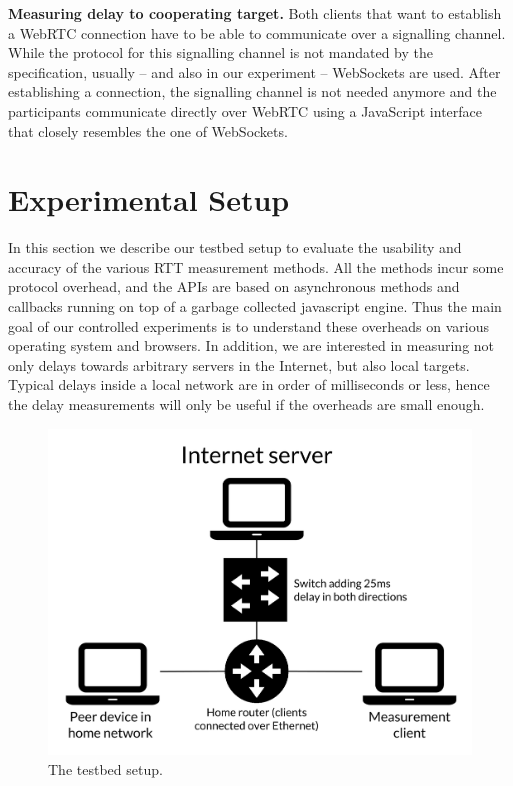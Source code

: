 \documentclass[12pt,twoside]{book}
\begin{document}
\textbf{Measuring delay to cooperating target.} Both clients that want to establish a WebRTC connection have to be able to communicate over a signalling channel. While the protocol for this signalling channel is not mandated by the specification, usually – and also in our experiment – WebSockets are used. After establishing a connection, the signalling channel is not needed anymore and the participants communicate directly over WebRTC using a JavaScript interface that closely resembles the one of WebSockets. 


\section{Experimental Setup}
\label{sec:setup}


In this section we describe our testbed setup to evaluate the usability and accuracy of the various RTT measurement methods. 
All the methods incur some protocol overhead,
and the APIs are based on asynchronous methods and callbacks running on top of a garbage collected javascript engine. Thus the main goal of our controlled experiments is to understand these overheads on various operating system and browsers. In addition, we are interested in measuring not only delays towards arbitrary servers in the Internet, but also local targets.
Typical delays inside a local network are in order of milliseconds or less, hence the delay measurements will only be useful if the  overheads are small enough.

\begin{figure}[tb]
\begin{center}
\includegraphics[width=0.65\columnwidth]{figures/setup}
\end{center}
\caption{The testbed setup.}\label{fig:setup}
\end{figure}
\end{document}
